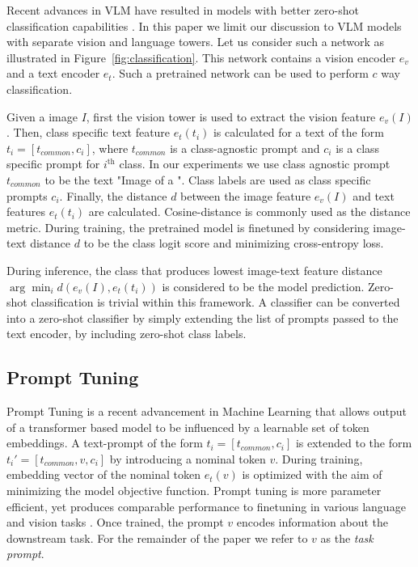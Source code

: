 \documentclass[10pt,twocolumn,letterpaper]{article}
\begin{document}
Recent advances in VLM have resulted in models with better zero-shot classification capabilities \cite{clip, albef, align, flamingo}. In this paper we limit our discussion to VLM models with separate vision and language towers. Let us consider such a network as illustrated in Figure~\ref{fig:classification}. This network contains a vision encoder $e_v$ and a text encoder $e_t$. Such a pretrained network can be used to perform $c$ way classification.

Given a image $I$, first the vision tower is used to extract the vision feature $e_v(I)$. Then, class specific text feature $e_t(t_i)$ is calculated for a text of the form $t_i = [ t_{common} , c_i ]$, where $t_{common}$ is a class-agnostic prompt and $c_i$ is a class specific prompt for $i^\text{th}$ class. In our experiments we use class agnostic prompt $t_{common}$ to be the text "Image of a ". Class labels are used as class specific prompts $c_i$. Finally, the distance $d$ between the image feature  $e_v(I)$ and text features $e_t(t_i)$ are calculated. Cosine-distance  is commonly used as the distance metric. During training, the pretrained model is finetuned by considering image-text distance $d$ to be the class logit score and minimizing cross-entropy loss.

During inference, the class that produces lowest image-text feature distance $\arg\min_i d(e_v(I), e_t(t_i))$ is considered to be the model prediction. Zero-shot classification is trivial within this framework. A classifier can be converted into a zero-shot classifier by simply extending the list of prompts passed to the text encoder, by including zero-shot class labels.   

\subsection{Prompt Tuning}
Prompt Tuning is a recent advancement in Machine Learning \cite{lester-etal-2021-power} that allows output of a transformer based model to be influenced by a learnable set of token embeddings. A text-prompt of the form $t_i = [ t_{common} , c_i ]$ is extended to the form $t_i' = [ t_{common}, v, c_i ]$ by introducing a nominal token $v$. During training, embedding vector of the nominal token $e_t(v)$ is optimized with the aim of minimizing the model objective function. Prompt tuning is more parameter efficient, yet produces comparable performance to finetuning in various language and vision tasks \cite{liu-etal-2022-p}. Once trained, the prompt $v$ encodes information about the downstream task. For the remainder of the paper we refer to $v$ as the \textit{task prompt}.
\end{document}
